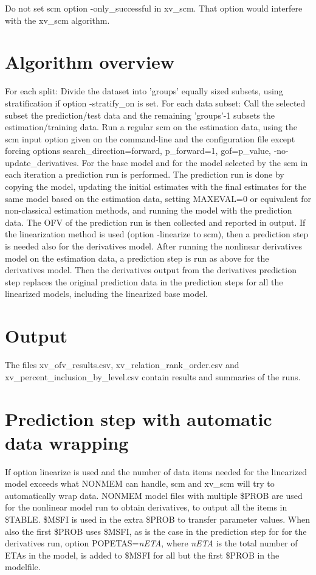 Do not set scm option -only\_successful in xv\_scm. That option would interfere with the xv\_scm algorithm.


\section{Algorithm overview}

For each split: Divide the dataset into 'groups' equally sized subsets, using stratification if option -stratify\_on is set.
For each data subset: Call the selected subset the prediction/test data and the remaining 'groups'-1 subsets the estimation/training data. Run a regular scm on the estimation data, using the scm input option given on the command-line and the configuration file except forcing options search\_direction=forward, p\_forward=1,  gof=p\_value, -no-update\_derivatives. For the base model and for the model selected by the scm in each iteration a  prediction run is performed. The prediction run is  done by copying the model, updating the initial estimates with the final estimates for the same model based on the estimation data, setting MAXEVAL=0 or equivalent for non-classical estimation methods, and running the model with the prediction data. The OFV of the prediction run is then collected and reported in output.
If the linearization method is used (option -linearize to scm), then a prediction step is needed also for the derivatives model. After running the nonlinear derivatives model on the estimation data, a prediction step is run as above for the derivatives model. Then the derivatives output from the derivatives prediction step replaces the original prediction data in the prediction steps for all the linearized models, including the linearized base model.

\section{Output}
The files xv\_ofv\_results.csv,  xv\_relation\_rank\_order.csv and xv\_percent\_inclusion\_by\_level.csv contain results and summaries of the runs.

\section{Prediction step with automatic data wrapping}

If option linearize is used and the number of data items needed for the linearized model exceeds what NONMEM can handle, scm and xv\_scm will try to automatically wrap data. NONMEM model files with multiple \$PROB are used for the nonlinear model run to obtain derivatives, to output all the items in \$TABLE. \$MSFI is used in the extra \$PROB to transfer parameter values. When also the first \$PROB uses \$MSFI, as is the case in the prediction step for for the derivatives run, option POPETAS=\emph{nETA}, where \emph{nETA} is the total number of ETAs in the model, is added to \$MSFI for all but the first \$PROB in the modelfile.


